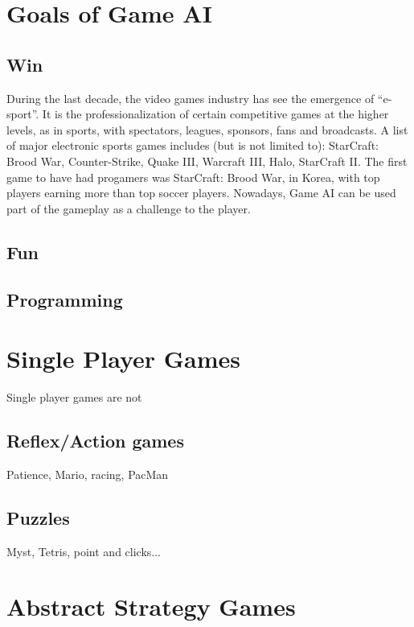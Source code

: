 \section{Goals of Game AI}

\subsection{Win}
During the last decade, the video games industry has see the emergence of ``e-sport''. It is the professionalization of certain competitive games at the higher levels, as in sports, with spectators, leagues, sponsors, fans and broadcasts. A %
list of major electronic sports games includes (but is not limited to): StarCraft: Brood War, Counter-Strike, Quake III, Warcraft III, Halo, StarCraft II. The first game to have had progamers was StarCraft: Brood War, in Korea, with top players earning more than top soccer players. Nowadays,
Game AI can be used part of the gameplay as a challenge to the player.


\subsection{Fun}

\subsection{Programming}

\section{Single Player Games}
Single player games are not
\subsection{Reflex/Action games}
Patience, Mario, racing, PacMan
\subsection{Puzzles}
Myst, Tetris, point and clicks...

\section{Abstract Strategy Games}
